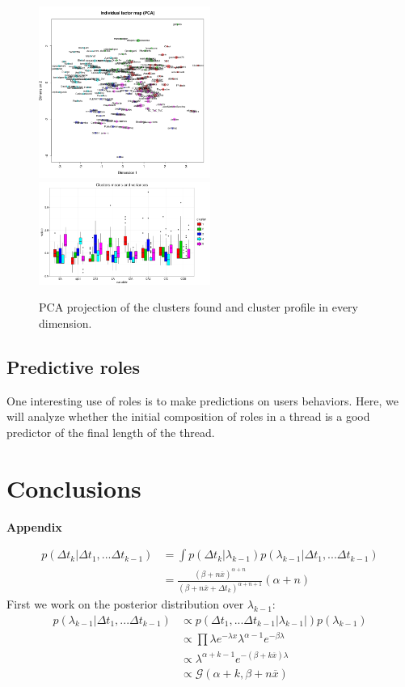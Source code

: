 \documentclass[smallextended]{svjour3}          %
\begin{document}
\begin{figure}
	\centering
	\includegraphics[width=0.5\textwidth]{PCA_nocolor}
	\includegraphics[width=0.5\textwidth]{whiskers}
	\caption{PCA projection of the clusters found and cluster profile in every dimension.}
	\label{fig:PCA}
\end{figure}

\subsection{Predictive roles}
One interesting use of roles is to make predictions on users behaviors. Here, we will analyze whether the initial composition of roles in a thread is a good predictor of the final length of the thread.

\section{Conclusions}

\newpage
\appendix
\noindent \textbf{\Large Appendix}
\vspace{-0.1cm}

\begin{align}
p(\Delta t_k | \Delta t_1,...\Delta t_{k-1})
&=
\int p(\Delta t_k | \lambda_{k-1})
p(\lambda_{k-1} |\Delta t_1,...\Delta t_{k-1})\\
&=\frac{(\beta + n\overline{x})^{\alpha+n}}{(\beta + n\overline{x}+\Delta t_k)^{\alpha+n+1}}(\alpha+n)
\end{align}
First we work on the posterior distribution over $\lambda_{k-1}$:
\begin{align}
p(\lambda_{k-1} |\Delta t_1,...\Delta t_{k-1})
&\propto
p(\Delta t_1,...\Delta t_{k-1} | \lambda_{k-1} |)p(\lambda_{k-1})\\
&\propto 
\prod \lambda e^{-\lambda x}  \lambda^{\alpha-1}e^{-\beta \lambda}\\
&\propto
\lambda^{\alpha+k-1}
e^{-(\beta+k\overline{x})\lambda}\\
&\propto\mathcal{G}(\alpha+k, \beta + n\overline{x})
\end{align}
\end{document}
